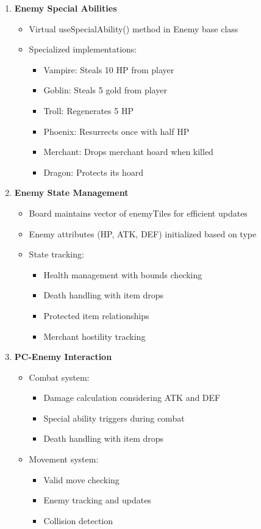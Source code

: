 \documentclass{article}
\begin{document}
\begin{enumerate}
    \item \textbf{Enemy Special Abilities}
    \begin{itemize}
        \item Virtual useSpecialAbility() method in Enemy base class
        \item Specialized implementations:
        \begin{itemize}
            \item Vampire: Steals 10 HP from player
            \item Goblin: Steals 5 gold from player
            \item Troll: Regenerates 5 HP
            \item Phoenix: Resurrects once with half HP
            \item Merchant: Drops merchant hoard when killed
            \item Dragon: Protects its hoard
        \end{itemize}
    \end{itemize}

    \item \textbf{Enemy State Management}
    \begin{itemize}
        \item Board maintains vector of enemyTiles for efficient updates
        \item Enemy attributes (HP, ATK, DEF) initialized based on type
        \item State tracking:
        \begin{itemize}
            \item Health management with bounds checking
            \item Death handling with item drops
            \item Protected item relationships
            \item Merchant hostility tracking
        \end{itemize}
    \end{itemize}

    \item \textbf{PC-Enemy Interaction}
    \begin{itemize}
        \item Combat system:
        \begin{itemize}
            \item Damage calculation considering ATK and DEF
            \item Special ability triggers during combat
            \item Death handling with item drops
        \end{itemize}
        \item Movement system:
        \begin{itemize}
            \item Valid move checking
            \item Enemy tracking and updates
            \item Collision detection
        \end{itemize}
    \end{itemize}
\end{enumerate}
\end{document}
